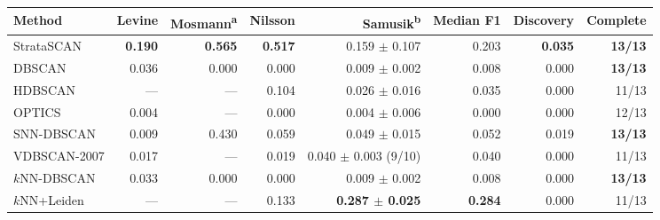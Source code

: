\begin{tabular}{lrrrrrrr}
\toprule
Method & Levine & Mosmann\textsuperscript{a} & Nilsson & Samusik\textsuperscript{b} & Median F1 & Discovery & Complete \\
\midrule
StrataSCAN & \textbf{0.190} & \textbf{0.565} & \textbf{0.517} & 0.159 $\pm$ 0.107 & 0.203 & \textbf{0.035} & \textbf{13/13} \\
DBSCAN & 0.036 & 0.000 & 0.000 & 0.009 $\pm$ 0.002 & 0.008 & 0.000 & \textbf{13/13} \\
HDBSCAN & --- & --- & 0.104 & 0.026 $\pm$ 0.016 & 0.035 & 0.000 & 11/13 \\
OPTICS & 0.004 & --- & 0.000 & 0.004 $\pm$ 0.006 & 0.000 & 0.000 & 12/13 \\
SNN-DBSCAN & 0.009 & 0.430 & 0.059 & 0.049 $\pm$ 0.015 & 0.052 & 0.019 & \textbf{13/13} \\
VDBSCAN-2007 & 0.017 & --- & 0.019 & 0.040 $\pm$ 0.003 (9/10) & 0.040 & 0.000 & 11/13 \\
$k$NN-DBSCAN & 0.033 & 0.000 & 0.000 & 0.009 $\pm$ 0.002 & 0.008 & 0.000 & \textbf{13/13} \\
$k$NN+Leiden & --- & --- & 0.133 & \textbf{0.287 $\pm$ 0.025} & \textbf{0.284} & 0.000 & 11/13 \\
\bottomrule
\end{tabular}
